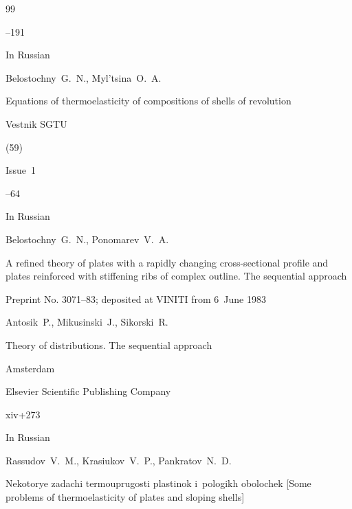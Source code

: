 \begin{thebibliography}{99}

--191






\lang In Russian

\by Belostochny~G.~N., Myl'tsina~O.~A.

\paper Equations of thermoelasticity of compositions of shells of revolution

\jour Vestnik SGTU


(59)

\issueinfo Issue~1

--64






\lang In Russian

\by Belostochny~G.~N., Ponomarev~V.~A.

\preprint A refined theory of plates with a rapidly changing cross-sectional profile and plates reinforced with stiffening ribs of complex outline. The sequential approach

\preprintinfo  Preprint No. 3071--83; deposited at VINITI  from 6~June 1983








\by Antosik~P.,  Mikusinski~J., Sikorski~R.

\book Theory of distributions. The sequential approach


\publaddr Amsterdam

\publ Elsevier Scientific Publishing Company

\totalpages xiv+273 





\lang In Russian

\by Rassudov~V.~M., Krasiukov~V.~P., Pankratov~N.~D.

\book Nekotorye zadachi termouprugosti plastinok i~pologikh obolochek \rm [Some problems of thermoelasticity of plates and sloping shells]


\end{thebibliography}
